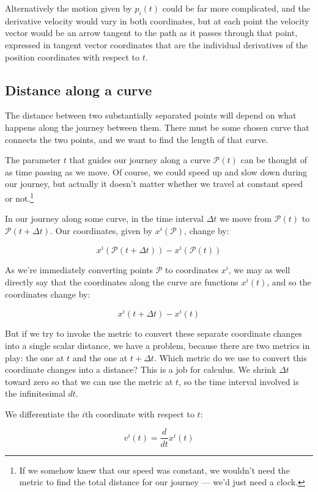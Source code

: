 Alternatively the motion given by $p_i(t)$ could be far more complicated, and the derivative velocity would vary in both coordinates, but at each point the velocity vector would be an arrow tangent to the path as it passes through that point, expressed in tangent vector coordinates that are the individual derivatives of the position coordinates with respect to $t$.

\subsection{Distance along a curve}

The distance between two substantially separated points will depend on what happens along the journey between them. There must be some chosen curve that connects the two points, and we want to find the length of that curve.

The parameter $t$ that guides our journey along a curve $\mathcal{P}(t)$ can be thought of as time passing as we move. Of course, we could speed up and slow down during our journey, but actually it doesn't matter whether we travel at constant speed or not.\footnote{If we somehow knew that our speed was constant, we wouldn't need the metric to find the total distance for our journey --- we'd just need a clock.}

In our journey along some curve, in the time interval $\Delta t$ we move from $\mathcal{P}(t)$ to $\mathcal{P}(t + \Delta t)$. Our coordinates, given by $x^i(\mathcal{P})$, change by:

$$
x^i(\mathcal{P}(t + \Delta t))
-
x^i(\mathcal{P}(t))
$$

As we're immediately converting points $\mathcal{P}$ to coordinates $x^i$, we may as well directly say that the coordinates along the curve are functions $x^i(t)$, and so the coordinates change by:

$$
x^i(t + \Delta t)
-
x^i(t)
$$

But if we try to invoke the metric to convert these separate coordinate changes into a single scalar distance, we have a problem, because there are two metrics in play: the one at $t$ and the one at $t + \Delta t$. Which metric do we use to convert this coordinate changes into a distance? This is a job for calculus. We shrink $\Delta t$ toward zero so that we can use the metric at $t$, so the time interval involved is the infinitesimal $dt$.

We differentiate the $i$th coordinate with respect to $t$:

$$
v^i(t) = \frac{d}{dt} x^i(t)
$$

